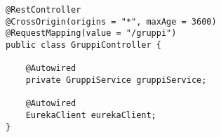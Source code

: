 \begin{lstlisting}[style = Java, caption = {Esempio di \textit{Dependency Injection} con Spring}]
@RestController
@CrossOrigin(origins = "*", maxAge = 3600)
@RequestMapping(value = "/gruppi")
public class GruppiController {

    @Autowired
    private GruppiService gruppiService;

    @Autowired
    EurekaClient eurekaClient;
}
\end{lstlisting}